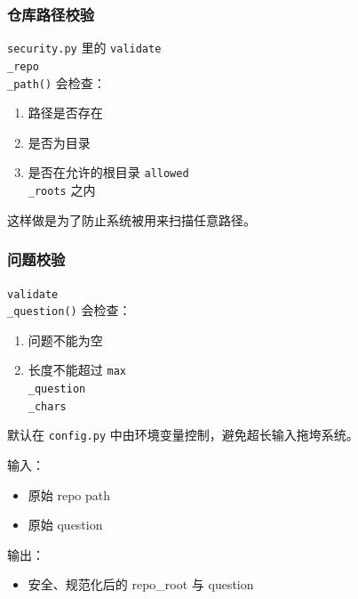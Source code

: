 \documentclass[UTF8,12pt,openany]{ctexbook}
\begin{document}
\subsubsection{仓库路径校验}

\texttt{security.py} 里的 \texttt{validate\\_repo\\_path()} 会检查：\par

\begin{enumerate}
\item 路径是否存在
\item 是否为目录
\item 是否在允许的根目录 \texttt{allowed\\_roots} 之内
\end{enumerate}

这样做是为了防止系统被用来扫描任意路径。\par

\subsubsection{问题校验}

\texttt{validate\\_question()} 会检查：\par

\begin{enumerate}
\item 问题不能为空
\item 长度不能超过 \texttt{max\\_question\\_chars}
\end{enumerate}

默认在 \texttt{config.py} 中由环境变量控制，避免超长输入拖垮系统。\par

输入：\par

\begin{itemize}
\item 原始 repo path
\item 原始 question
\end{itemize}

输出：\par

\begin{itemize}
\item 安全、规范化后的 repo\_root 与 question
\end{itemize}
\end{document}
